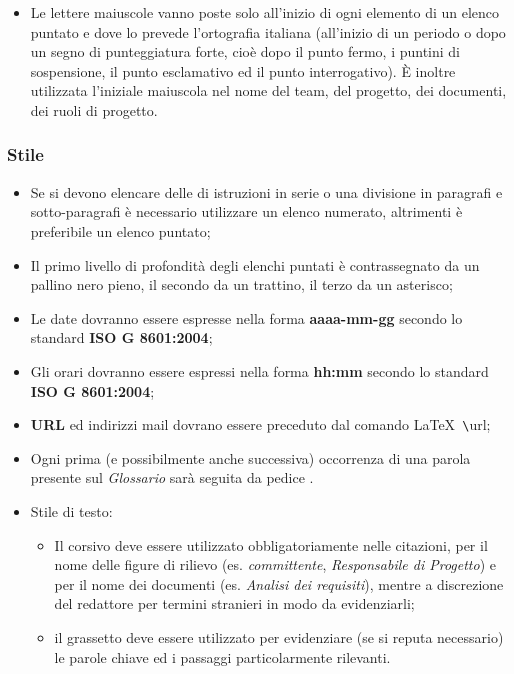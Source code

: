 \begin{itemize}

\item Le lettere maiuscole vanno poste solo all'inizio di ogni elemento di un elenco puntato e dove lo prevede l'ortografia italiana (all'inizio di un periodo o dopo un segno di punteggiatura forte, cioè dopo il punto fermo, i puntini di sospensione, il punto esclamativo ed il punto interrogativo). È inoltre utilizzata l'iniziale maiuscola nel nome del team, del progetto, dei documenti, dei ruoli di progetto.


\end{itemize}

\subsubsection{Stile}
\begin{itemize}
\item Se si devono elencare delle di istruzioni in serie o una divisione in paragrafi e sotto-paragrafi è necessario utilizzare un elenco numerato, altrimenti è preferibile un elenco puntato;

\item Il primo livello di profondità degli elenchi puntati è contrassegnato da un pallino nero pieno, il secondo da un trattino, il terzo da un asterisco;

\item Le date dovranno essere espresse nella forma \textbf{aaaa-mm-gg} secondo lo standard  \textbf{ISO G 8601:2004};

\item Gli orari dovranno essere espressi nella forma \textbf{hh:mm} secondo lo standard \textbf{ISO G 8601:2004};

\item \textbf{URL} ed indirizzi mail dovrano essere preceduto dal comando \LaTeX \verb+ \+url;

\item Ogni prima (e possibilmente anche successiva) occorrenza di una parola presente sul \textit{Glossario} sarà seguita da pedice .

\item Stile di testo:

\begin{itemize}

\item Il corsivo deve essere utilizzato obbligatoriamente nelle citazioni, per il nome delle figure di rilievo (es. \textit{committente}, \textit{Responsabile di Progetto}) e per il nome dei documenti (es. \textit{Analisi dei requisiti}), mentre a discrezione del redattore per termini stranieri in modo da evidenziarli;

\item il grassetto deve essere utilizzato per evidenziare (se si reputa necessario) le parole chiave ed i passaggi particolarmente rilevanti.

\end{itemize}

\end{itemize}
